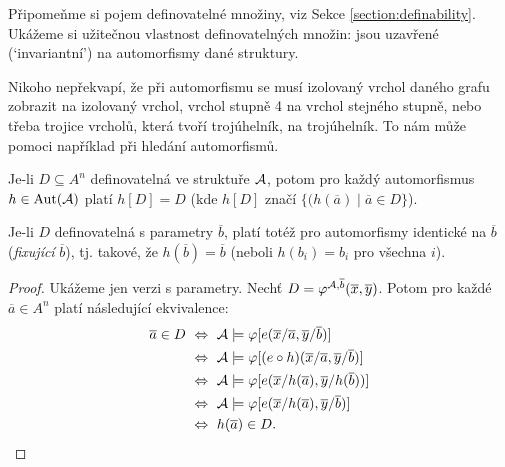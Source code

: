 Připomeňme si pojem definovatelné množiny, viz Sekce \ref{section:definability}. Ukážeme si užitečnou vlastnost definovatelných množin: jsou uzavřené (`invariantní') na automorfismy dané struktury. 

Nikoho nepřekvapí, že při automorfismu se musí izolovaný vrchol daného grafu zobrazit na izolovaný vrchol, vrchol stupně 4 na vrchol stejného stupně, nebo třeba trojice vrcholů, která tvoří trojúhelník, na trojúhelník. To nám může pomoci například při hledání automorfismů.

\begin{proposition}
    Je-li $D\subseteq A^n$ definovatelná ve struktuře $\mathcal{A}$, potom pro každý automorfismus $h\in\operatorname{Aut}(\mathcal{A})$ platí $h[D]=D$ (kde $h[D]$ značí $\{(h(\overline{a})\mid\overline{a}\in D\}$).

    Je-li $D$ definovatelná s parametry $\overline{b}$, platí totéž pro automorfismy identické na $\overline{b}$ (\emph{fixující} $\overline{b}$), tj. takové, že $h(\overline{b})=\overline{b}$ (neboli $h(b_i)=b_i$ pro všechna $i$).
\end{proposition}
\begin{proof}
    Ukážeme jen verzi s parametry. Nechť $D=\varphi^{\mathcal{A},\overline{b}}(\overline{x},\overline{y})$. Potom pro každé $\overline{a}\in A^n$ platí následující ekvivalence:
\begin{align*}
\overline{a}\in D\ 
&\Leftrightarrow\ \A\models \varphi[e(\overline{x}/\overline{a},\overline{y}/\overline{b})]\\
&\Leftrightarrow\  \A\models \varphi[(e\circ h)(\overline{x}/\overline{a},\overline{y}/\overline{b})]\\
&\Leftrightarrow\ \A\models \varphi[e(\overline{x}/h(\overline{a}),\overline{y}/h(\overline{b}))]\\
&\Leftrightarrow\ \A\models \varphi[e(\overline{x}/h(\overline{a}),\overline{y}/\overline{b})]\\
&\Leftrightarrow\ h(\overline{a})\in D.
\end{align*}
\end{proof}


